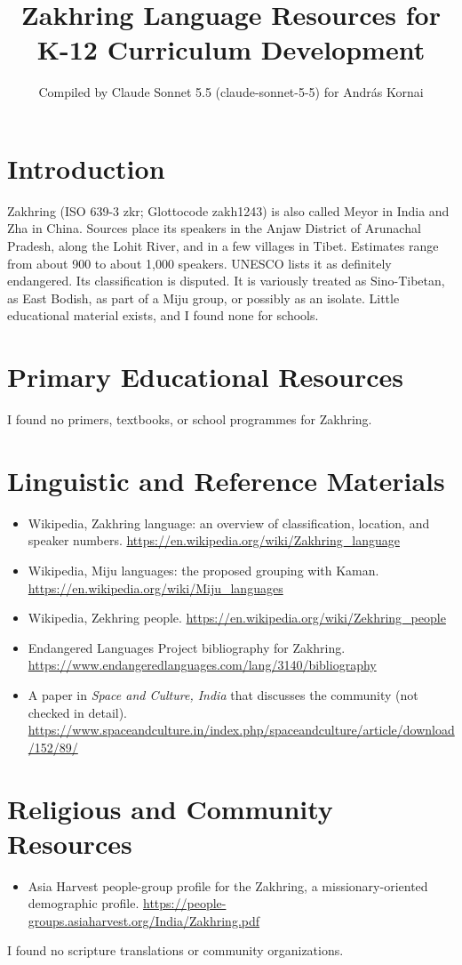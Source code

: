\documentclass[12pt]{article}
\title{Zakhring Language Resources for K-12 Curriculum Development}
\author{Compiled by Claude Sonnet 5.5 (claude-sonnet-5-5) for Andr\'as Kornai}
\date{}
\begin{document}
\maketitle

\section{Introduction}
Zakhring (ISO 639-3 zkr; Glottocode zakh1243) is also called Meyor in India and Zha in China. Sources place its speakers in the Anjaw District of Arunachal Pradesh, along the Lohit River, and in a few villages in Tibet. Estimates range from about 900 to about 1,000 speakers. UNESCO lists it as definitely endangered. Its classification is disputed. It is variously treated as Sino-Tibetan, as East Bodish, as part of a Miju group, or possibly as an isolate. Little educational material exists, and I found none for schools.

\section{Primary Educational Resources}
I found no primers, textbooks, or school programmes for Zakhring.

\section{Linguistic and Reference Materials}
\begin{itemize}
\item Wikipedia, Zakhring language: an overview of classification, location, and speaker numbers. \url{https://en.wikipedia.org/wiki/Zakhring_language}
\item Wikipedia, Miju languages: the proposed grouping with Kaman. \url{https://en.wikipedia.org/wiki/Miju_languages}
\item Wikipedia, Zekhring people. \url{https://en.wikipedia.org/wiki/Zekhring_people}
\item Endangered Languages Project bibliography for Zakhring. \url{https://www.endangeredlanguages.com/lang/3140/bibliography}
\item A paper in \emph{Space and Culture, India} that discusses the community (not checked in detail). \url{https://www.spaceandculture.in/index.php/spaceandculture/article/download/152/89/}
\end{itemize}

\section{Religious and Community Resources}
\begin{itemize}
\item Asia Harvest people-group profile for the Zakhring, a missionary-oriented demographic profile. \url{https://people-groups.asiaharvest.org/India/Zakhring.pdf}
\end{itemize}
I found no scripture translations or community organizations.
\end{document}
